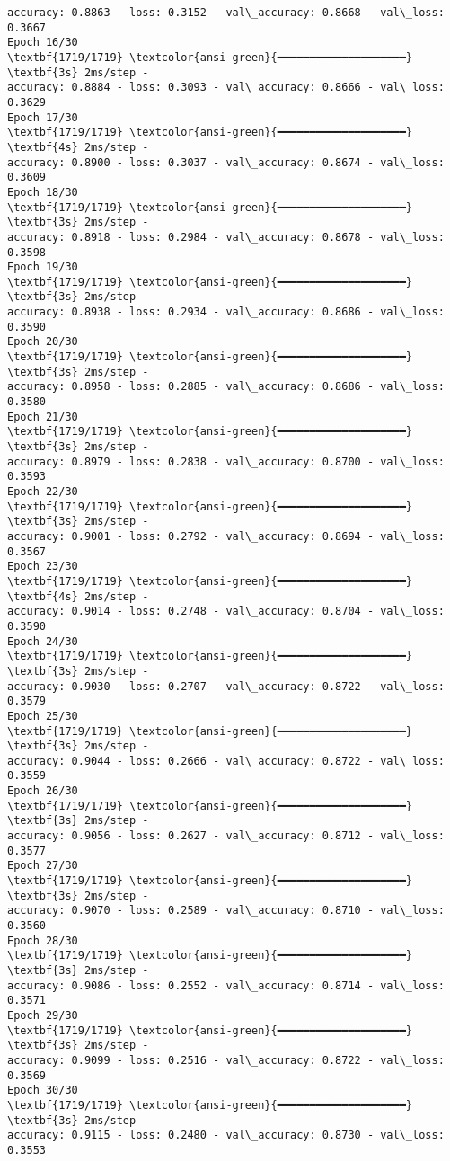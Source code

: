 \documentclass[12pt letter]{report}
\begin{document}
\begin{Verbatim}[commandchars=\\\{\}]
accuracy: 0.8863 - loss: 0.3152 - val\_accuracy: 0.8668 - val\_loss: 0.3667
Epoch 16/30
\textbf{1719/1719} \textcolor{ansi-green}{━━━━━━━━━━━━━━━━━━━━} \textbf{3s} 2ms/step -
accuracy: 0.8884 - loss: 0.3093 - val\_accuracy: 0.8666 - val\_loss: 0.3629
Epoch 17/30
\textbf{1719/1719} \textcolor{ansi-green}{━━━━━━━━━━━━━━━━━━━━} \textbf{4s} 2ms/step -
accuracy: 0.8900 - loss: 0.3037 - val\_accuracy: 0.8674 - val\_loss: 0.3609
Epoch 18/30
\textbf{1719/1719} \textcolor{ansi-green}{━━━━━━━━━━━━━━━━━━━━} \textbf{3s} 2ms/step -
accuracy: 0.8918 - loss: 0.2984 - val\_accuracy: 0.8678 - val\_loss: 0.3598
Epoch 19/30
\textbf{1719/1719} \textcolor{ansi-green}{━━━━━━━━━━━━━━━━━━━━} \textbf{3s} 2ms/step -
accuracy: 0.8938 - loss: 0.2934 - val\_accuracy: 0.8686 - val\_loss: 0.3590
Epoch 20/30
\textbf{1719/1719} \textcolor{ansi-green}{━━━━━━━━━━━━━━━━━━━━} \textbf{3s} 2ms/step -
accuracy: 0.8958 - loss: 0.2885 - val\_accuracy: 0.8686 - val\_loss: 0.3580
Epoch 21/30
\textbf{1719/1719} \textcolor{ansi-green}{━━━━━━━━━━━━━━━━━━━━} \textbf{3s} 2ms/step -
accuracy: 0.8979 - loss: 0.2838 - val\_accuracy: 0.8700 - val\_loss: 0.3593
Epoch 22/30
\textbf{1719/1719} \textcolor{ansi-green}{━━━━━━━━━━━━━━━━━━━━} \textbf{3s} 2ms/step -
accuracy: 0.9001 - loss: 0.2792 - val\_accuracy: 0.8694 - val\_loss: 0.3567
Epoch 23/30
\textbf{1719/1719} \textcolor{ansi-green}{━━━━━━━━━━━━━━━━━━━━} \textbf{4s} 2ms/step -
accuracy: 0.9014 - loss: 0.2748 - val\_accuracy: 0.8704 - val\_loss: 0.3590
Epoch 24/30
\textbf{1719/1719} \textcolor{ansi-green}{━━━━━━━━━━━━━━━━━━━━} \textbf{3s} 2ms/step -
accuracy: 0.9030 - loss: 0.2707 - val\_accuracy: 0.8722 - val\_loss: 0.3579
Epoch 25/30
\textbf{1719/1719} \textcolor{ansi-green}{━━━━━━━━━━━━━━━━━━━━} \textbf{3s} 2ms/step -
accuracy: 0.9044 - loss: 0.2666 - val\_accuracy: 0.8722 - val\_loss: 0.3559
Epoch 26/30
\textbf{1719/1719} \textcolor{ansi-green}{━━━━━━━━━━━━━━━━━━━━} \textbf{3s} 2ms/step -
accuracy: 0.9056 - loss: 0.2627 - val\_accuracy: 0.8712 - val\_loss: 0.3577
Epoch 27/30
\textbf{1719/1719} \textcolor{ansi-green}{━━━━━━━━━━━━━━━━━━━━} \textbf{3s} 2ms/step -
accuracy: 0.9070 - loss: 0.2589 - val\_accuracy: 0.8710 - val\_loss: 0.3560
Epoch 28/30
\textbf{1719/1719} \textcolor{ansi-green}{━━━━━━━━━━━━━━━━━━━━} \textbf{3s} 2ms/step -
accuracy: 0.9086 - loss: 0.2552 - val\_accuracy: 0.8714 - val\_loss: 0.3571
Epoch 29/30
\textbf{1719/1719} \textcolor{ansi-green}{━━━━━━━━━━━━━━━━━━━━} \textbf{3s} 2ms/step -
accuracy: 0.9099 - loss: 0.2516 - val\_accuracy: 0.8722 - val\_loss: 0.3569
Epoch 30/30
\textbf{1719/1719} \textcolor{ansi-green}{━━━━━━━━━━━━━━━━━━━━} \textbf{3s} 2ms/step -
accuracy: 0.9115 - loss: 0.2480 - val\_accuracy: 0.8730 - val\_loss: 0.3553
    \end{Verbatim}
\end{document}
